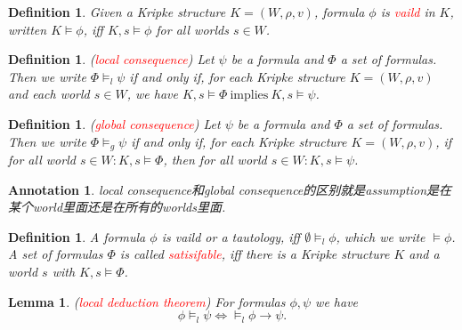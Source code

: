 \documentclass{article}
\theoremstyle{plain}
\newtheorem{lemma}[theorem]{Lemma}
\newtheorem{definition}[theorem]{Definition}
\newtheorem{annotation}[theorem]{Annotation}
\theoremstyle{nonumberplain}
\newcommand{\redt}[1]{\textcolor{red}{#1}}
\begin{document}
\begin{definition}
\rm Given a Kripke structure $K = (W,\rho, v)$, formula $\phi$ is \redt{vaild} in $K$, written $K \vDash \phi$, iff $K,s \vDash \phi$ for all worlds $s \in W$.
\end{definition}

\begin{definition}
\rm (\redt{local consequence}) Let $\psi$ be a formula and $\Phi$ a set of formulas. Then we write $\Phi \vDash_l \psi$ if and only if, for each Kripke structure $K = (W, \rho, v)$ and each world $s \in W$, we have $K, s \vDash \Phi~\text{implies}~K,s \vDash \psi$.  
\end{definition}

\begin{definition}
\rm (\redt{global consequence}) Let $\psi$ be a formula and $\Phi$ a set of formulas. Then we write $\Phi \vDash_g \psi$ if and only if, for each Kripke structure $K = (W, \rho, v)$, if for all world $s \in W:K, s \vDash \Phi$, then for all world $s \in W: K,s \vDash \psi$.
\end{definition}

\begin{annotation}
\rm local consequence和global consequence的区别就是assumption是在某个world里面还是在所有的worlds里面. 
\end{annotation}

\begin{definition}
\rm A formula $\phi$ is vaild or a tautology, iff $\emptyset \vDash_l \phi$, which we write $\vDash \phi$. A set of formulas $\Phi$ is called \redt{satisifable}, iff there is a Kripke structure $K$ and a world $s$ with $K,s \vDash \Phi$. 
\end{definition}

\begin{lemma}
\rm (\redt{local deduction theorem}) For formulas $\phi, \psi$ we have 
$$
\phi \vDash_l \psi \iff \vDash_l \phi \to \psi.
$$
\end{lemma}
\end{document}
